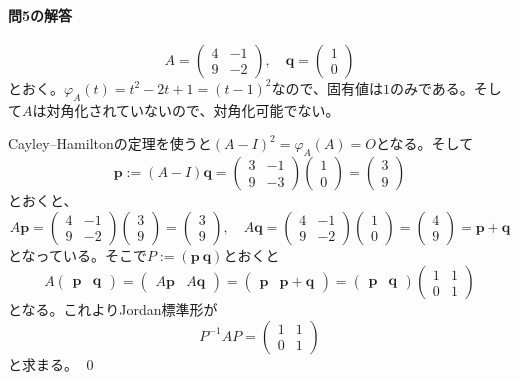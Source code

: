 \paragraph{問5の解答}

\[
A = 
\begin{pmatrix}
4 & -1 \\
9 & -2
\end{pmatrix}, \quad
\bm{q} = 
\begin{pmatrix}
1 \\
0 
\end{pmatrix}
\]
とおく。$\varphi_A(t) = t^2 - 2t + 1 = (t - 1)^2$なので、固有値は$1$のみである。そして$A$は対角化されていないので、対角化可能でない。

Cayley--Hamiltonの定理を使うと$(A - I)^2 = \varphi_A(A) = O$となる。そして
\[
\bm{p} := (A - I) \bm{q}
=
\begin{pmatrix}
3 & -1 \\
9 & -3
\end{pmatrix}
\begin{pmatrix}
1 \\
0 
\end{pmatrix}
=
\begin{pmatrix}
3 \\
9
\end{pmatrix}
\]
とおくと、
\[
A\bm{p} =
\begin{pmatrix}
4 & -1 \\
9 & -2
\end{pmatrix}
\begin{pmatrix}
3 \\
9
\end{pmatrix}
=
\begin{pmatrix}
3 \\
9
\end{pmatrix}, \quad
A\bm{q} = 
\begin{pmatrix}
4 & -1 \\
9 & -2
\end{pmatrix}
\begin{pmatrix}
1 \\
0 
\end{pmatrix}
=
\begin{pmatrix}
4 \\
9
\end{pmatrix}
= \bm{p} + \bm{q}
\]
となっている。そこで$P := (\bm{p} \ \bm{q})$とおくと
\[
A
\begin{pmatrix}
\bm{p} & \bm{q}
\end{pmatrix}
=
\begin{pmatrix}
A\bm{p} & A\bm{q}
\end{pmatrix}
=
\begin{pmatrix}
\bm{p} & \bm{p} + \bm{q}
\end{pmatrix}
=
\begin{pmatrix}
\bm{p} & \bm{q}
\end{pmatrix}
\begin{pmatrix}
1 & 1 \\
0 & 1
\end{pmatrix}
\]
となる。これよりJordan標準形が
\[
P^{-1} A P =
\begin{pmatrix}
1 & 1 \\
0 & 1
\end{pmatrix}
\]
と求まる。 \qed

